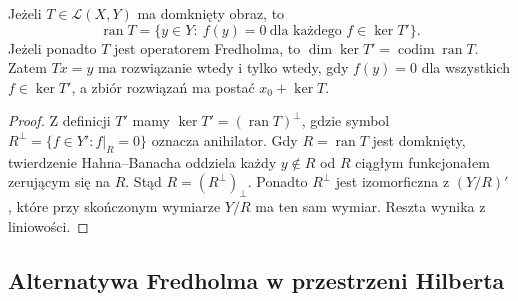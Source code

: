 \begin{twierdzenie}
\label{thm:fredholm-compatibility30}
Jeżeli $T\in\mathcal L(X,Y)$ ma domknięty obraz, to
\[\operatorname{ran}T=\{y\in Y:\ f(y)=0\ \text{dla każdego }f\in\ker T'\}.\]
Jeżeli ponadto $T$ jest operatorem Fredholma, to
$\dim\ker T'=\operatorname{codim}\operatorname{ran}T$.
Zatem $Tx=y$ ma rozwiązanie wtedy i tylko wtedy, gdy
$f(y)=0$ dla wszystkich $f\in\ker T'$, a zbiór
rozwiązań ma postać $x_0+\ker T$.
\end{twierdzenie}
\begin{proof}
Z definicji $T'$ mamy $\ker T'=(\operatorname{ran}T)^\perp$,
gdzie symbol $R^\perp=\{f\in Y':f|_R=0\}$ oznacza
anihilator. Gdy $R=\operatorname{ran}T$ jest domknięty,
twierdzenie Hahna--Banacha oddziela każdy $y\notin R$
od $R$ ciągłym funkcjonałem zerującym się na $R$.
Stąd $R=(R^\perp)_\perp$. Ponadto $R^\perp$ jest
izomorficzna z $(Y/R)'$, które przy skończonym wymiarze
$Y/R$ ma ten sam wymiar. Reszta wynika z liniowości.
\end{proof}

\subsection{Alternatywa Fredholma w przestrzeni Hilberta}

